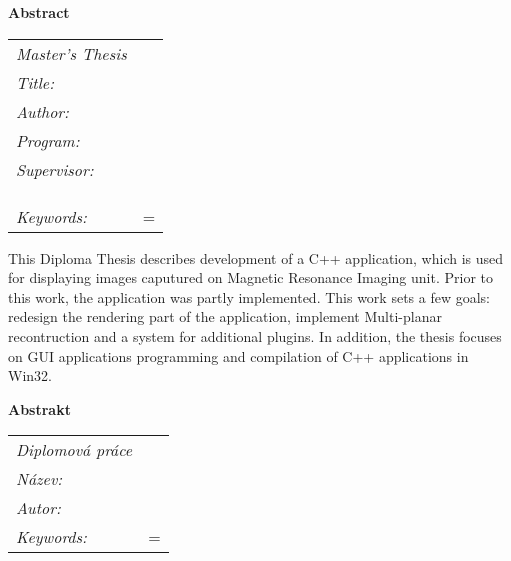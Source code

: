 \thispagestyle{empty}

\newbox\odstavecbox
\newlength\vyskaodstavce
\newcommand\odstavec[2]{
    \setbox\odstavecbox=\hbox{
         \parbox[t]{#1}{#2\vrule width 0pt depth 4pt}}
    \global\vyskaodstavce=\dp\odstavecbox
    \box\odstavecbox}
\newcommand{\delka}{120mm}


\newcommand{\pracovisteVed}{\km,\\ \fjfi,\\ \cvut}

\newcommand{\konzultant}{}
\newcommand{\pracovisteKonz}{}

\newcommand{\klicova}{programování, GUI, grafické uživatelské rozhraní, C++, Qt, DICOM}
\newcommand{\keywords}{programming, GUI, graphic user interface, C++, Qt, DICOM}   



{\noindent \bf \large Abstract} \\[5mm]
\begin{tabular}{l p{10cm}}
	{\em Master's Thesis}	& 	\\[1mm]
	{\em Title:}	& \nazeven	\\[1mm]
	{\em Author:}	& \autor	\\[1mm]
	{\em Program:} 	& \obor		\\[1mm]
	{\em Supervisor:}& \vedouci	\\
				& \km		\\
				& \fjfi		\\
				& \cvut		\\[1mm]
	{\em Keywords:}	& \odstavec{\delka}{\keywords}	\\
\end{tabular}

This Diploma Thesis describes development of a C++ application, which is used for displaying images caputured on Magnetic Resonance Imaging unit. Prior to this work, the application was partly implemented. This work sets a few goals: redesign the rendering part of the application, implement Multi-planar recontruction and a system for additional plugins. In addition, the thesis focuses on GUI applications programming and compilation of C++ applications in Win32.


\vspace{10mm}
{\noindent \bf \large Abstrakt} \\[5mm]
\begin{tabular}{l p{10cm}}
	{\em Diplomová práce}	& 	\\[1mm]
	{\em Název:}	& \nazevcz	\\[1mm]
	{\em Autor:}	& \autor	\\[1mm]
	{\em Keywords:}	& \odstavec{\delka}{\klicova}	\\
\end{tabular}

